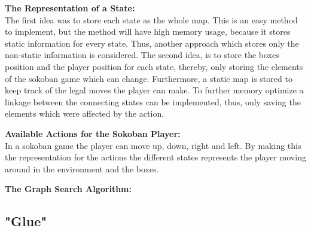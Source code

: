 \documentclass[../report.tex]{subfiles}
\begin{document}
\textbf{The Representation of a State:}\\
The first idea was to store each state as the whole map. This is an easy method to implement, but the method will have high memory usage, because it stores static information for every state. Thus, another approach which stores only the non-static information is considered. The second idea, is to store the boxes position and the player position for each state, thereby, only storing the elements of the sokoban game which can change. Furthermore, a static map is stored to keep track of the legal moves the player can make. To further memory optimize a linkage between the connecting states can be implemented, thus, only saving the elements which were affected by the action.

\textbf{Available Actions for the Sokoban Player:}\\
In a sokoban game the player can move up, down, right and left. By making this the representation for the actions the different states represents the player moving around in the environment and the boxes. 

\textbf{The Graph Search Algorithm:}\\

\subsection{"Glue"} \label{sec:combination}
\end{document}
